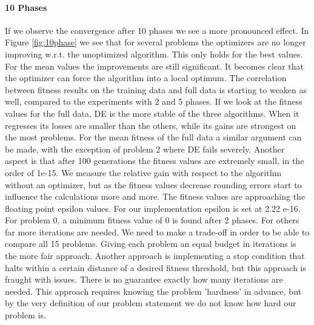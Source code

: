 \paragraph{10 Phases}
If we observe the convergence after 10 phases we see a more pronounced effect. In Figure \ref{fig:10phase} we see that for several problems the optimizers are no longer improving w.r.t. the unoptimized algorithm. This only holds for the best values. For the mean values the improvements are still significant. It becomes clear that the optimizer can force the algorithm into a local optimum. The correlation between fitness results on the training data and full data is starting to weaken as well, compared to the experiments with 2 and 5 phases. 
If we look at the fitness values for the full data, DE is the more stable of the three algorithms. When it regresses its losses are smaller than the others, while its gains are strongest on the most problems. For the mean fitness of the full data a similar argument can be made, with the exception of problem 2 where DE fails severely.
Another aspect is that after 100 generations the fitness values are extremely small, in the order of 1e-15. We measure the relative gain with respect to the algorithm without an optimizer, but as the fitness values decrease rounding errors start to influence the calculations more and more. The fitness values are approaching the floating point epsilon values. For our implementation epsilon is set at 2.22 e-16. For problem 0, a minimum fitness value of 0 is found after 2 phases. For others far more iterations are needed. We need to make a trade-off in order to be able to compare all 15 problems. Giving each problem an equal budget in iterations is the more fair approach. Another approach is implementing a stop condition that halts within a certain distance of a desired fitness threshold, but this approach is fraught with issues. There is no guarantee exactly how many iterations are needed. This approach requires knowing the problem 'hardness' \cite{GPHardness} in advance, but by the very definition of our problem statement we do not know how hard our problem is. 